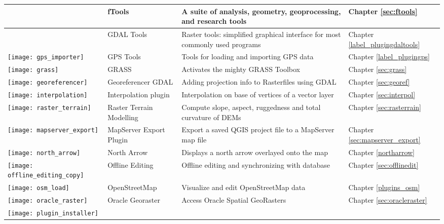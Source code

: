 {\begin{longtable}{|p{1.2cm}|p{3.8cm}|p{7.5cm}|p{3cm}|}
 & fTools \index{plugins!ftools}& A suite of analysis, geometry, geoprocessing, and research tools & Chapter \ref{sec:ftools}\\
\hline
 & GDAL Tools \index{plugins!gdaltools} & Raster tools: simplified graphical interface for most commonly used programs & Chapter \ref{label_plugingdaltools}\\
\hline
\texttt{[image: gps\_importer]}
 & GPS Tools \index{plugins!gps}& Tools for loading and importing GPS data & Chapter \ref{label_plugingps}\\
\hline
\texttt{[image: grass]}
 & GRASS \index{plugin!grass toolbox} & Activates the mighty GRASS Toolbox & Chapter \ref{sec:grass}\\
\hline
\texttt{[image: georeferencer]}
 & Georeferencer GDAL \index{plugin!georeferencer} & Adding projection info to Rasterfiles using GDAL & Chapter \ref{sec:georef}\\
\hline
\texttt{[image: interpolation]}
& Interpolation plugin \index{plugins!Interpolation}& Interpolation on base of vertices of a vector layer & Chapter \ref{sec:interpol}\\
\hline
\texttt{[image: raster\_terrain]}
& Raster Terrain Modelling \index{plugins!Raster Terrain Modelling}& Compute slope, aspect,
ruggedness and total curvature of DEMs & Chapter \ref{sec:rasterrain}\\
\hline
\texttt{[image: mapserver\_export]}
& MapServer Export Plugin \index{plugins!MapServer Export}& Export a saved QGIS project file to a MapServer map file & Chapter \ref{sec:mapserver_export} \\
\hline
\texttt{[image: north\_arrow]}
& North Arrow \index{plugins!north arrow}& Displays a north arrow overlayed onto the map & Chapter \ref{northarrow}\\
\hline
\texttt{[image: offline\_editing\_copy]}
 & Offline Editing & Offline editing and synchronizing with database & Chapter \ref{sec:offlinedit}\\
\hline
\texttt{[image: osm\_load]}
 & OpenStreetMap & Visualize and edit OpenStreetMap data & Chapter \ref{plugins_osm}\\
\hline
\texttt{[image: oracle\_raster]}
 & Oracle Georaster \index{plugins!georaster}& Access Oracle Spatial GeoRasters & Chapter 
\ref{sec:oracleraster}\\
\hline
\texttt{[image: plugin\_installer]}

\end{longtable}}
